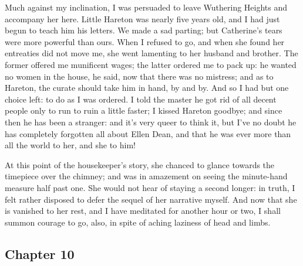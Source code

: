 \par Much against my inclination, I was persuaded to leave Wuthering Heights and accompany her here. Little Hareton was nearly five years old, and I had just begun to teach him his letters. We made a sad parting; but Catherine's tears were more powerful than ours. When I refused to go, and when she found her entreaties did not move me, she went lamenting to her husband and brother. The former offered me munificent wages; the latter ordered me to pack up: he wanted no women in the house, he said, now that there was no mistress; and as to Hareton, the curate should take him in hand, by and by. And so I had but one choice left: to do as I was ordered. I told the master he got rid of all decent people only to run to ruin a little faster; I kissed Hareton goodbye; and since then he has been a stranger: and it's very queer to think it, but I've no doubt he has completely forgotten all about Ellen Dean, and that he was ever more than all the world to her, and she to him!
\par 
\par At this point of the housekeeper's story, she chanced to glance towards the timepiece over the chimney; and was in amazement on seeing the minute-hand measure half past one. She would not hear of staying a second longer: in truth, I felt rather disposed to defer the sequel of her narrative myself. And now that she is vanished to her rest, and I have meditated for another hour or two, I shall summon courage to go, also, in spite of aching laziness of head and limbs.


\subsection*{Chapter 10}

